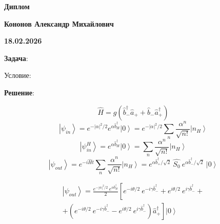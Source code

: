 \documentclass[12pt]{article}
\begin{document}
\begin{large}
\begin{center}
\LARGE \textbf{Диплом}
\par
\LARGE \textbf{Кононов Александр Михайлович}
\par
    \textbf{18.02.2026}
\end{center}
\par \textbf{Задача}:
\par Условие:
\par
\par
\par \textbf{Решение}:


\[
    \hat{H} = g \left( \hat{b}^\dag_{-} \hat{a}_{+} + \hat{b}_{-} \hat{a}^\dag_{+} \right)
\]
\[
    \left| \psi_{in} \right> = e^{-\left| \alpha \right|^2 / 2} e^{\alpha \hat{b}^{\dag}_H} \left| 0 \right> = e^{-\left| \alpha \right|^2 / 2} \sum_n \frac{\alpha^n}{\sqrt{n!}}  \left| n_H \right>
\]
\[
    \left| \psi_{in}^H \right> =  e^{\alpha \hat{b}^{\dag}_H} \left| 0 \right> = \sum_n \frac{\alpha^n}{\sqrt{n!}}  \left| n_H \right>
\]
\[
    \left| \psi_{out} \right> =  e^{-i\hat{H}t} \sum_n \frac{\alpha^n}{\sqrt{n!}} \left| n_H \right> = e^{\alpha \hat{b}^{\dag}_{+} / \sqrt{2}} \ \hat{S_0}  \ e^{\alpha \hat{b}^{\dag}_{-} / \sqrt{2}} \ \left| 0 \right>
\]


\begin{gather*}
    \left| \psi_{out} \right> = \frac{e^{-\left| \alpha \right|^2 / 2} \ e^{\alpha \hat{b}^{\dag}_{H}}}{2}  \left[ e^{-i \theta / 2 } \ e^{-i \gamma \hat{b}^{\dag}_{-} } + e^{i \theta / 2 } \ e^{i \gamma \hat{b}^{\dag}_{-} } + \\
    + \left. \left( e^{-i \theta / 2 } \ e^{-i \gamma \hat{b}^{\dag}_{-} } - e^{i \theta / 2 } \ e^{i \gamma \hat{b}^{\dag}_{-} } \right) \hat{a}^{\dag}_{+} \right] \left| 0 \right>
\end{gather*}


\end{large}
\end{document}
